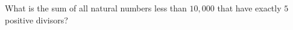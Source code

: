 What is the sum of all natural numbers less than $10{,}000$ that have exactly $5$ positive divisors?
